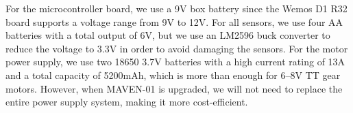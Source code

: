 \vspace{1em}
\par
For the microcontroller board, we use a 9V box battery since the Wemos D1 R32 board supports a voltage range 
from 9V to 12V. For all sensors, we use four AA batteries with a total output of 6V, but we use an LM2596 buck converter to reduce the voltage
to 3.3V in order to avoid damaging the sensors. For the motor power supply, we use two 18650 3.7V batteries with a high current rating of 13A and a total capacity of 5200mAh,
which is more than enough for 6--8V TT gear motors. However, when MAVEN-01 is upgraded, we will not need to replace the entire power supply system, making it more cost-efficient.






















